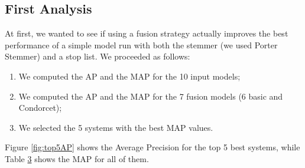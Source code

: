 	\subsection{First Analysis}
	At first, we wanted to see if using a fusion strategy actually improves the best performance of a simple model run with both the stemmer (we used Porter Stemmer) and a stop list.
	We proceeded as follows:
	\begin{enumerate}
		\item We computed the AP and the MAP for the 10 input models;
		\item We computed the AP and the MAP for the 7 fusion models (6 basic and Condorcet);
		\item We selected the 5 systems with the best MAP values.
	\end{enumerate}
	Figure \ref{fig:top5AP} shows the Average Precision for the top 5 best systems, while Table \hyperref[tab:17SysMAP]{3} shows the MAP for all of them.
	
